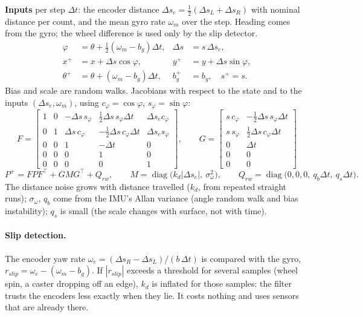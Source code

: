 \documentclass[11pt,a4paper]{article}
\newcommand{\diag}{\operatorname{diag}}
\newcommand{\T}{^{\!\top}}
\begin{document}
\textbf{Inputs} per step $\Delta t$: the encoder distance
$\Delta s_e=\tfrac12(\Delta s_L+\Delta s_R)$ with nominal distance per count, and
the mean gyro rate $\omega_m$ over the step. Heading comes from the gyro; the
wheel difference is used only by the slip detector.
\begin{equation}
\begin{aligned}
\varphi &= \theta+\tfrac12(\omega_m-b_g)\Delta t, & \Delta s &= s\,\Delta s_e,\\
x^+ &= x+\Delta s\cos\varphi, & y^+ &= y+\Delta s\sin\varphi,\\
\theta^+ &= \theta+(\omega_m-b_g)\Delta t, & b_g^+ &= b_g,\quad s^+=s .
\end{aligned}\label{eq:ekfpred}
\end{equation}
Bias and scale are random walks. Jacobians with respect to the state and to the
inputs $(\Delta s_e,\omega_m)$, using $c_\varphi=\cos\varphi$, $s_\varphi=\sin\varphi$:
\begin{equation}
F=\begin{bmatrix}
1&0&-\Delta s\,s_\varphi & \tfrac12\Delta s\,s_\varphi\Delta t & \Delta s_e c_\varphi\\
0&1&\Delta s\,c_\varphi & -\tfrac12\Delta s\,c_\varphi\Delta t & \Delta s_e s_\varphi\\
0&0&1&-\Delta t&0\\
0&0&0&1&0\\
0&0&0&0&1
\end{bmatrix},\qquad
G=\begin{bmatrix}
s\,c_\varphi & -\tfrac12\Delta s\,s_\varphi\Delta t\\
s\,s_\varphi & \tfrac12\Delta s\,c_\varphi\Delta t\\
0&\Delta t\\ 0&0\\ 0&0
\end{bmatrix}
\end{equation}
\begin{equation}
P^+=F P F\T + G M G\T + Q_{rw},\qquad
M=\diag\bigl(k_d|\Delta s_e|,\ \sigma_\omega^2\bigr),\qquad
Q_{rw}=\diag\bigl(0,0,0,\ q_b\Delta t,\ q_s\Delta t\bigr).
\end{equation}
The distance noise grows with distance travelled ($k_d$, from repeated
straight runs); $\sigma_\omega$, $q_b$ come from the IMU's Allan variance (angle
random walk and bias instability); $q_s$ is small (the scale changes with
surface, not with time).

\paragraph{Slip detection.} The encoder yaw rate
$\omega_e=(\Delta s_R-\Delta s_L)/(b\,\Delta t)$ is compared with the gyro,
$r_{slip}=\omega_e-(\omega_m-b_g)$. If $|r_{slip}|$ exceeds a threshold for
several samples (wheel spin, a caster dropping off an edge), $k_d$ is inflated
for those samples: the filter trusts the encoders less exactly when they lie.
It costs nothing and uses sensors that are already there.
\end{document}
